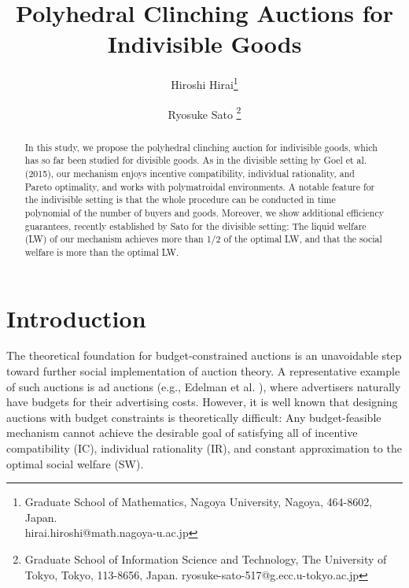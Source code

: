 \documentclass[letterpaper,11pt]{article}
\title{Polyhedral Clinching Auctions for Indivisible Goods} %
\author{Hiroshi Hirai\thanks{Graduate School of Mathematics, Nagoya University, Nagoya, 464-8602, Japan. \\hirai.hiroshi@math.nagoya-u.ac.jp} \and Ryosuke Sato \thanks{Graduate School of Information Science and Technology, The University of Tokyo, Tokyo, 113-8656, Japan. ryosuke-sato-517@g.ecc.u-tokyo.ac.jp}}
\begin{document}
\theoremstyle{definition}
\newtheorem{definition}{Definition}[section]
\newtheorem{proposition}[definition]{Proposition}
\newtheorem{lemma}[definition]{Lemma}
\newtheorem*{main}{Main Theorem}
\newtheorem{theorem}[definition]{Theorem}
\newtheorem{corollary}[definition]{Corollary}
\newtheorem{remark}[definition]{Remark}
\newtheorem{fact}[definition]{Fact}
\newtheorem{claim}[definition]{Claim}
\newtheorem{observation}[definition]{Observation}
\newtheorem{assmp}[definition]{Assumption}
\newtheorem{example}[definition]{Example}


%
\maketitle              %
%
\begin{abstract}
In this study, we propose the polyhedral clinching auction for indivisible goods, 
which has so far been studied for divisible goods. As in the divisible setting by Goel et al. (2015), 
our mechanism enjoys incentive compatibility, individual rationality, and Pareto optimality, 
and works with polymatroidal environments. A notable feature for the indivisible setting 
is that the whole procedure can be conducted in time polynomial of the number of buyers and goods. 
Moreover, we show additional efficiency guarantees, recently established by Sato for the divisible setting: 
The liquid welfare (LW) of our mechanism achieves more than 1/2 of the optimal LW, 
and that the social welfare is more than the optimal LW. 
\end{abstract}
%
%
%

\section{Introduction}
The theoretical foundation for budget-constrained auctions is an unavoidable step toward further social implementation of auction theory. A representative example of such auctions is ad auctions (e.g., Edelman et al. \cite{EOS2007}), where advertisers naturally have budgets for their advertising costs. However, it is well known  \cite{DLN2012,DL2014}  that designing auctions with budget constraints 
is theoretically difficult: Any budget-feasible mechanism cannot achieve the desirable goal of satisfying all of incentive compatibility (IC), individual rationality (IR), and constant approximation to the optimal social welfare (SW).
\end{document}
